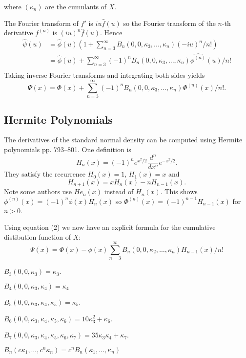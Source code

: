 \documentclass[fleqn]{amsart}
\theoremstyle{definition}
\begin{document}
where \((\kappa_n)\) are the cumulants of \(X\).

The Fourier transform of \(f'\) is \(iu \hat f(u)\) so
the Fourier transform of the \(n\)-th derivative
\(f^{(n)}\) is \((iu)^n\hat f(u)\). Hence
\begin{align*}
\hat{\psi}(u) &= \hat{\phi}(u)(1 + \sum_{n=3}^\infty B_n(0, 0,\kappa_3,...,\kappa_n) (-iu)^n/n!)\\
	&= \hat{\phi}(u) + \sum_{n=3}^\infty (-1)^n B_n(0, 0, \kappa_3,...,\kappa_n)
	\widehat{\phi^{(n)}}(u)/n!\\
\end{align*}
Taking inverse Fourier transforms and integrating both
sides yields
\begin{equation}
	\Psi(x) = \Phi(x) + \sum_{n=3}^\infty (-1)^n B_n(0,0,\kappa_3,...,\kappa_n) \Phi^{(n)}(x)/n!.
\end{equation}

\subsection{Hermite Polynomials}
The derivatives of the standard normal density 
can be computed using Hermite polynomials\cite{AbrSte1964}
pp. 793--801.
One definition is
\[
H_n(x) = (-1)^n e^{x^2/2}\frac{d^n}{dx^n}e^{-x^2/2}.
\]
They satisfy the recurrence \(H_0(x) = 1\), \(H_1(x) = x\) and
\[
H_{n+1}(x) = xH_n(x) - n H_{n-1}(x).
\]
Note some authors use \(He_n(x)\) instead of \(H_n(x)\).
This shows \(\phi^{(n)}(x) = (-1)^n\phi(x) H_n(x)\)
so \(\Phi^{(n)}(x) = (-1)^{n-1} H_{n-1}(x)\) for \(n > 0\).

Using equation (2) we now have an explicit formula for the cumulative
distibution function of \(X\):
\begin{equation}
\Psi(x) = \Phi(x) - \phi(x)\sum_{n=3}^\infty
B_n(0,0,\kappa_2,\dots,\kappa_n) H_{n-1}(x)/n!
\end{equation}

\(B_3(0,0,\kappa_3) = \kappa_3\).

\(B_4(0,0,\kappa_3,\kappa_4) = \kappa_4\)

\(B_5(0,0,\kappa_3,\kappa_4,\kappa_5) = \kappa_5\).

\(B_6(0,0,\kappa_3,\kappa_4,\kappa_5,\kappa_6) = 10\kappa_3^2 + \kappa_6\).

\(B_7(0,0,\kappa_3,\kappa_4,\kappa_5,\kappa_6,\kappa_7) = 35\kappa_3\kappa_4 + \kappa_7\).

\(B_n(c\kappa_1, \ldots, c^n\kappa_n) = c^nB_n(\kappa_1, \ldots, \kappa_n)\)
\end{document}

